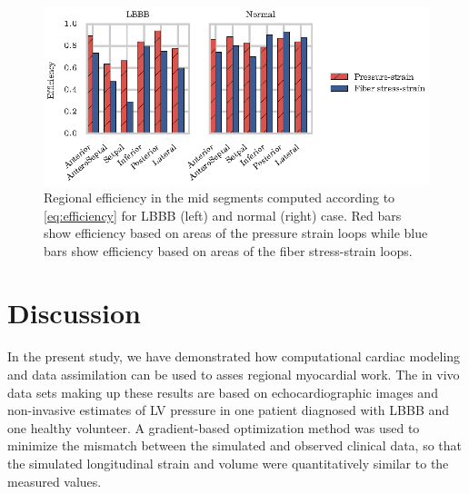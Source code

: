\begin{figure}[htbp]
  \centering
  \includegraphics{figures/regional_work_indices}
  \caption{\label{fig:regional_work_indices} Regional efficiency in
    the mid segments computed according to \eqref{eq:efficiency} for LBBB (left) and normal (right)
    case. Red bars show efficiency based on areas of the pressure
    strain loops while blue bars show efficiency based on areas of the
    fiber stress-strain loops.}
\end{figure}


% 
\section{Discussion}
In the present study, we have demonstrated how computational cardiac
modeling and data assimilation can be used to asses regional
myocardial work. The in vivo data sets making up these results are
based on echocardiographic images and non-invasive estimates of LV
pressure in one patient diagnosed with LBBB and one healthy volunteer. 
A gradient-based optimization method was used to minimize the mismatch
between the simulated and observed clinical data, so that the simulated
longitudinal strain and volume were quantitatively similar to the
measured values.




